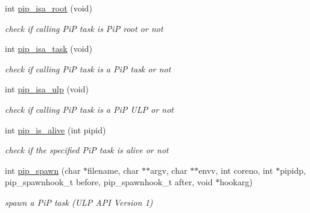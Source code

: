 \begin{DoxyCompactItemize}
\item 
int \hyperlink{group__libpip_ga6f1045bdbf682cb2ac504f09b57b73e9}{pip\-\_\-isa\-\_\-root} (void)
\begin{DoxyCompactList}\small\item\em check if calling Pi\-P task is Pi\-P root or not \end{DoxyCompactList}\end{DoxyCompactItemize}
\begin{DoxyCompactItemize}
\item 
int \hyperlink{group__libpip_gaf0283e47ad2d415206d6a3fa61e8a0a9}{pip\-\_\-isa\-\_\-task} (void)
\begin{DoxyCompactList}\small\item\em check if calling Pi\-P task is a Pi\-P task or not \end{DoxyCompactList}\end{DoxyCompactItemize}
\begin{DoxyCompactItemize}
\item 
int \hyperlink{group__libpip_gafc11d79f0f63c4c57ccb5c3bb2803241}{pip\-\_\-isa\-\_\-ulp} (void)
\begin{DoxyCompactList}\small\item\em check if calling Pi\-P task is a Pi\-P U\-L\-P or not \end{DoxyCompactList}\end{DoxyCompactItemize}
\begin{DoxyCompactItemize}
\item 
int \hyperlink{group__libpip_gacefb1f29e5f5d9b21309a1d041e78790}{pip\-\_\-is\-\_\-alive} (int pipid)
\begin{DoxyCompactList}\small\item\em check if the specified Pi\-P task is alive or not \end{DoxyCompactList}\end{DoxyCompactItemize}
\begin{DoxyCompactItemize}
\item 
int \hyperlink{group__libpip_gae9187ea22ecf0623fa3ecfba5337f52d}{pip\-\_\-spawn} (char $\ast$filename, char $\ast$$\ast$argv, char $\ast$$\ast$envv, int coreno, int $\ast$pipidp, pip\-\_\-spawnhook\-\_\-t before, pip\-\_\-spawnhook\-\_\-t after, void $\ast$hookarg)
\begin{DoxyCompactList}\small\item\em spawn a Pi\-P task (U\-L\-P A\-P\-I Version 1) \end{DoxyCompactList}\end{DoxyCompactItemize}


